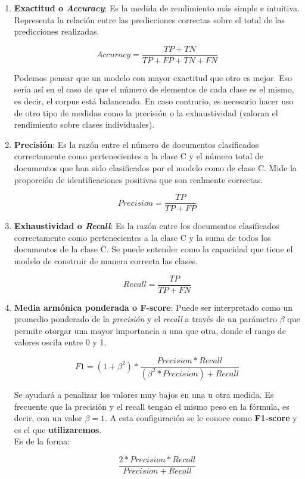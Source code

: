 \documentclass[a4paper,12pt]{report}
\begin{document}
\begin{enumerate}

\item \textbf{Exactitud o \textit{Accuracy}}: Es la medida de rendimiento más simple e intuitiva. Representa la relación entre las predicciones correctas sobre el total de las predicciones realizadas. 

\[  Accuracy = \frac{TP + TN}{TP + FP + TN + FN} \]

\vspace{4mm}
Podemos pensar que un modelo con mayor exactitud que otro es mejor. Eso sería así en el caso de que el número de elementos de cada clase es el mismo, es decir, el corpus está balanceado. En caso contrario, es necesario hacer uso de otro tipo de medidas como la precisión o la exhaustividad (valoran el rendimiento sobre clases individuales). 

\vspace{4mm}
\item \textbf{Precisión}: Es la razón entre el número de documentos clasificados correctamente como pertenecientes a la clase C y el número total de documentos que han sido clasificados por el modelo como de clase C. Mide la proporción de identificaciones positivas que son realmente correctas.

\[ Precision = \frac{TP}{TP + FP} \]

\vspace{4mm}
\item \textbf{Exhaustividad o \textit{Recall}}: Es la razón entre los documentos clasificados correctamente como pertenecientes a la clase C y la suma de todos los documentos de la clase C. Se puede entender como la capacidad que tiene el modelo de construir de manera correcta las clases.

\[ Recall = \frac{TP}{TP + FN} \]

\vspace{4mm}
\item \textbf{Media armónica ponderada o F-score}: Puede ser interpretado como un promedio ponderado de la \textit{precisión} y el \textit{recall} a través de un parámetro $\beta$ que permite otorgar una mayor importancia a una que otra, donde el rango de valores oscila entre 0 y 1. 

\[ F1 = (1 + \beta^{2})*  \frac{Precision * Recall}{(\beta^{2}*Precision) + Recall} \]

\vspace{4mm}
Se ayudará a penalizar los valores muy bajos en una u otra medida. Es frecuente que la precisión y el recall tengan el mismo peso en la fórmula, es decir, con un valor $\beta = 1$. A esta configuración se le conoce como \textbf{F1-score} y es el que \textbf{utilizaremos}.\\ Es de la forma:

\[ \frac{2*Precision*Recall}{Precision + Recall} \]
\vspace{4mm}
\end{enumerate}
\end{document}
